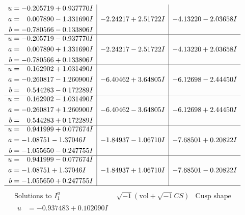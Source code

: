 \documentclass[1p]{elsarticle_modified}
\theoremstyle{definition}
\newcommand{\I}{\sqrt{-1}}
\begin{document}
$$\begin{array}{c|c|c}
\begin{aligned}
u &= -0.205719 + 0.937770 I \\
a &= \phantom{-}0.007890 - 1.331690 I \\
b &= -0.780566 - 0.133806 I\end{aligned}
 & -2.24217 + 2.51722 I & -4.13220 - 2.03658 I \\ \hline\begin{aligned}
u &= -0.205719 - 0.937770 I \\
a &= \phantom{-}0.007890 + 1.331690 I \\
b &= -0.780566 + 0.133806 I\end{aligned}
 & -2.24217 - 2.51722 I & -4.13220 + 2.03658 I \\ \hline\begin{aligned}
u &= \phantom{-}0.162902 + 1.031490 I \\
a &= -0.260817 - 1.260900 I \\
b &= \phantom{-}0.544283 - 0.172289 I\end{aligned}
 & -6.40462 + 3.64805 I & -6.12698 - 2.44450 I \\ \hline\begin{aligned}
u &= \phantom{-}0.162902 - 1.031490 I \\
a &= -0.260817 + 1.260900 I \\
b &= \phantom{-}0.544283 + 0.172289 I\end{aligned}
 & -6.40462 - 3.64805 I & -6.12698 + 2.44450 I \\ \hline\begin{aligned}
u &= \phantom{-}0.941999 + 0.077674 I \\
a &= -1.08751 - 1.37046 I \\
b &= -1.055650 - 0.247755 I\end{aligned}
 & -1.84937 - 1.06710 I & -7.68501 + 0.20822 I \\ \hline\begin{aligned}
u &= \phantom{-}0.941999 - 0.077674 I \\
a &= -1.08751 + 1.37046 I \\
b &= -1.055650 + 0.247755 I\end{aligned}
 & -1.84937 + 1.06710 I & -7.68501 - 0.20822 I\\
 \hline 
 \end{array}$$\newpage$$\begin{array}{c|c|c}  
\text{Solutions to }I^u_{1}& \I (\text{vol} + \sqrt{-1}CS) & \text{Cusp shape}\\
 \hline 
\begin{aligned}
u &= -0.937483 + 0.102090 I \\

\end{aligned}
\end{array}$$
\end{document}
